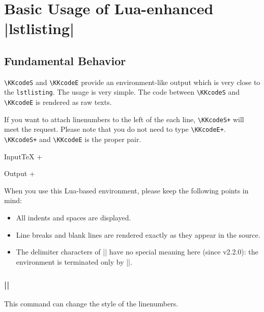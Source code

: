 \documentclass[luatex,fontsize=8pt,paper=b5,twoside]{jlreq}%
\begin{document}
\section{Basic Usage of Lua-enhanced \KKverb|lstlisting|}
\subsection{Fundamental Behavior}
\KKvScanOff
\verb|\KKcodeS| and \verb|\KKcodeE| provide an environment-like output which is very close to the \verb|lstlisting|.
The usage is very simple. The code between \verb|\KKcodeS| and \verb|\KKcodeE| is rendered as raw texts.

If you want to attach linenumbers to the left of the each line, \verb|\KKcodeS+| will meet the request. Please note that you do not need to type \verb|\KKcodeE+|. \verb|\KKcodeS+| and \verb|\KKcodeE| is the proper pair.

\begin{SourceCode}{Input}{TeX}
  \KKcodeS+
  \long\def\myprog#1{%
    \ifx#1\empty
      \relax
    \else
      \message{Processing...}%
      #1
    \fi
  }
  \KKcodeE
\end{SourceCode}
\KKvScanOn
\begin{OutPut}{Output}
\KKcodeS+
\long\def\myprog#1{%
  \ifx#1\empty
    \relax
  \else
    \message{Processing...}%
    #1
  \fi
}
\KKcodeE
\end{OutPut}

When you use this Lua-based environment, please keep the following points in mind:

\begin{itemize}
  \item All indents and spaces are displayed.
  \item Line breaks and blank lines are rendered exactly as they appear in the source.
  \item The delimiter characters of \KKverb|\KKverb| have no special meaning here (since v2.2.0): the environment is terminated only by \KKverb|\KKcodeE|.
\end{itemize}

\subsubsection{\KKverb|\KKvLNChange|}
This command can change the style of the linenumbers.
\end{document}
